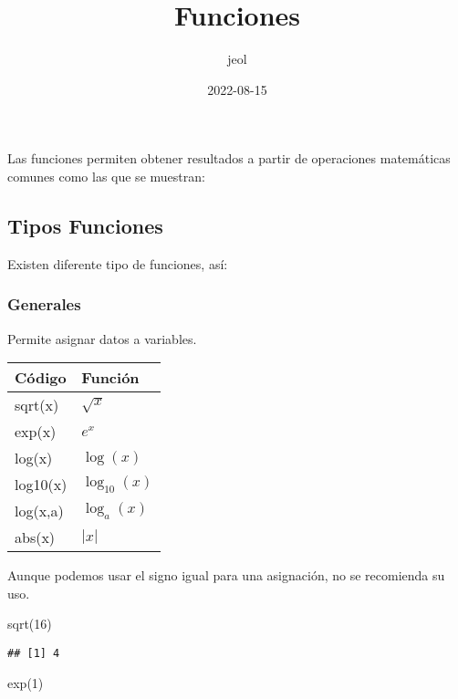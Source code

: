 \documentclass[
]{article}
\title{Funciones}
\author{jeol}
\date{2022-08-15}
\newenvironment{Shaded}{\begin{snugshade}}{\end{snugshade}}
\newcommand{\DecValTok}[1]{\textcolor[rgb]{0.00,0.00,0.81}{#1}}
\newcommand{\FunctionTok}[1]{\textcolor[rgb]{0.00,0.00,0.00}{#1}}
\newcommand{\NormalTok}[1]{#1}
\begin{document}
\maketitle

Las funciones permiten obtener resultados a partir de operaciones
matemáticas comunes como las que se muestran:

\hypertarget{tipos-funciones}{%
\subsection{Tipos Funciones}\label{tipos-funciones}}

Existen diferente tipo de funciones, así:

\hypertarget{generales}{%
\subsubsection{Generales}\label{generales}}

Permite asignar datos a variables.

\begin{longtable}[]{@{}ll@{}}
\toprule()
Código & Función \\
\midrule()
\endhead
sqrt(x) & \(\sqrt{x}\) \\
exp(x) & \(e^{x}\) \\
log(x) & \(\log(x)\) \\
log10(x) & \(\log_{10}(x)\) \\
log(x,a) & \(\log_{a}(x)\) \\
abs(x) & \(|x|\) \\
\bottomrule()
\end{longtable}

Aunque podemos usar el signo igual para una asignación, no se recomienda
su uso.

\begin{Shaded}
\begin{Highlighting}[]
\FunctionTok{sqrt}\NormalTok{(}\DecValTok{16}\NormalTok{)}
\end{Highlighting}
\end{Shaded}

\begin{verbatim}
## [1] 4
\end{verbatim}

\begin{Shaded}
\begin{Highlighting}[]
\FunctionTok{exp}\NormalTok{(}\DecValTok{1}\NormalTok{)}
\end{Highlighting}
\end{Shaded}
\end{document}
